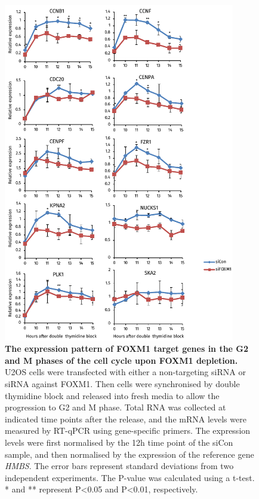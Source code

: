 \begin{figure}[!h]
    \centering
    \includegraphics[width=0.9\textwidth]{chapter3/figures_foxm1/fig21.pdf}
    \caption[The expression pattern of FOXM1 target genes in the G2 and M phases of the cell cycle upon FOXM1 depletion]{\textbf{The expression pattern of FOXM1 target genes in the G2 and M phases of the cell cycle upon FOXM1 depletion.} U2OS cells were transfected with either a non-targeting siRNA or siRNA against FOXM1. Then cells were synchronised by double thymidine block and released into fresh media to allow the progression to G2 and M phase. Total RNA was collected at indicated time points after the release, and the mRNA levels were measured by RT-qPCR using gene-specific primers. The expression levels were first normalised by the 12h time point of the siCon sample, and then normalised by the expression of the reference gene \textit{HMBS}. The error bars represent standard deviations from two independent experiments. The P-value was calculated using a t-test. * and ** represent P<0.05 and P<0.01, respectively.}
    \label{fig:fig21}
\end{figure}

